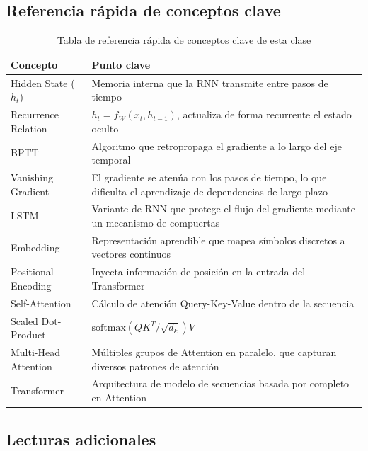 \documentclass[a4paper]{article}
\begin{document}
\subsection{Referencia rápida de conceptos clave}

\begin{table}[H]
\centering
\caption{Tabla de referencia rápida de conceptos clave de esta clase}
\begin{tabular}{ll}
\toprule
\textbf{Concepto} & \textbf{Punto clave} \\
\midrule
Hidden State ($h_t$) & Memoria interna que la RNN transmite entre pasos de tiempo \\
Recurrence Relation & $h_t = f_W(x_t, h_{t-1})$, actualiza de forma recurrente el estado oculto \\
BPTT & Algoritmo que retropropaga el gradiente a lo largo del eje temporal \\
Vanishing Gradient & El gradiente se atenúa con los pasos de tiempo, lo que dificulta el aprendizaje de dependencias de largo plazo \\
LSTM & Variante de RNN que protege el flujo del gradiente mediante un mecanismo de compuertas \\
Embedding & Representación aprendible que mapea símbolos discretos a vectores continuos \\
Positional Encoding & Inyecta información de posición en la entrada del Transformer \\
Self-Attention & Cálculo de atención Query-Key-Value dentro de la secuencia \\
Scaled Dot-Product & $\text{softmax}(QK^T/\sqrt{d_k})V$ \\
Multi-Head Attention & Múltiples grupos de Attention en paralelo, que capturan diversos patrones de atención \\
Transformer & Arquitectura de modelo de secuencias basada por completo en Attention \\
\bottomrule
\end{tabular}
\end{table}

\subsection{Lecturas adicionales}
\end{document}
